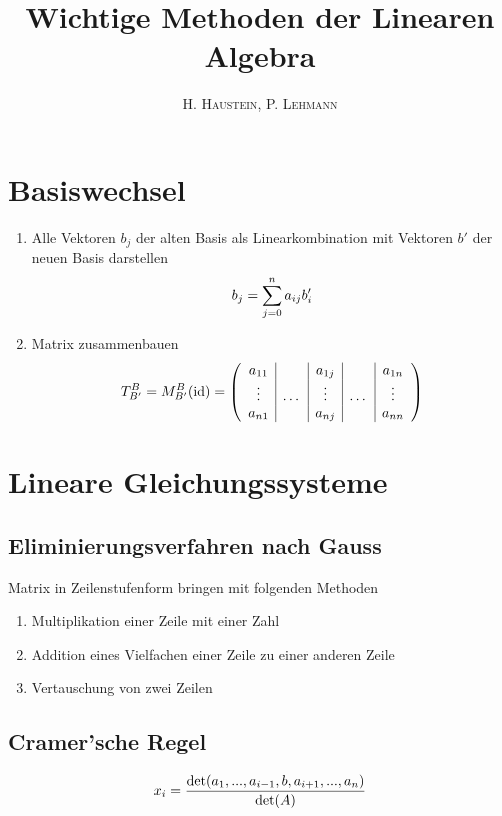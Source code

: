 \documentclass[ngerman,a4paper]{article}
\title{\textbf{Wichtige Methoden der Linearen Algebra}}
\author{\textsc{H. Haustein}, \textsc{P. Lehmann}}
\DeclareMathOperator{\id}{id}
\begin{document}
\maketitle

\section{Basiswechsel}
\begin{enumerate}[label=\textbf{\arabic*.}]
	\item Alle Vektoren $b_j$ der alten Basis als Linearkombination mit Vektoren $b'$ der neuen Basis darstellen
	\begin{align}
		b_j = \sum_{j=0}^n a_{ij}b'_i\notag
	\end{align}
	\item Matrix zusammenbauen
	\begin{align}
		T^B_{B'} = M^B_{B'}(\id) = \left(\begin{array}{c|c|c|c|c}
			a_{11} & & a_{1j} & & a_{1n} \\
			\vdots & \dots & \vdots & \dots & \vdots \\
			a_{n1} & & a_{nj} & & a_{nn}
		\end{array}\right)\notag
	\end{align}
\end{enumerate}

\section{Lineare Gleichungssysteme}
\subsection{Eliminierungsverfahren nach Gauss}
Matrix in Zeilenstufenform bringen mit folgenden Methoden
\begin{enumerate}[label=\textbf{\arabic*.}]
	\item Multiplikation einer Zeile mit einer Zahl
	\item Addition eines Vielfachen einer Zeile zu einer anderen Zeile
	\item Vertauschung von zwei Zeilen
\end{enumerate}

\subsection{Cramer'sche Regel}
\begin{align}
	x_i = \frac{\det(a_1,...,a_{i-1},b,a_{i+1},...,a_n)}{\det(A)}\notag
\end{align}
\end{document}
